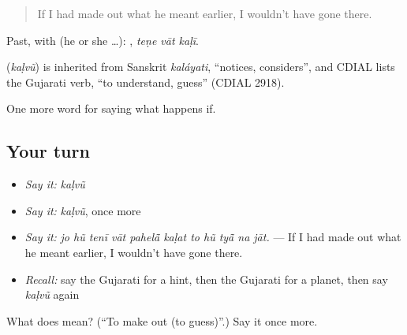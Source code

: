 \begin{quote}
If I had made out what he meant earlier, I wouldn't have gone there.
\end{quote}

Past, with  (he or she …):   , \emph{teṇe vāt kaḷī}.

\begin{cousinweb}
\textbf{} (\emph{kaḷvũ}) is inherited from Sanskrit \emph{kaláyati}, \textquotedblleft{}notices, considers\textquotedblright{}, and CDIAL lists the Gujarati verb, \textquotedblleft{}to understand, guess\textquotedblright{} (CDIAL 2918).
\end{cousinweb}

\begin{grammarlens}[title={What you've built}]
One more word for saying what happens if.
\end{grammarlens}

\subsection*{Your turn}
\begin{itemize}
\raggedright
  \item \emph{Say it:} \emph{kaḷvũ}
  \item \emph{Say it:} \emph{kaḷvũ}, once more
  \item \emph{Say it:} \emph{jo hũ tenī vāt pahelā̃ kaḷat to hũ tyā̃ na jāt.} — If I had made out what he meant earlier, I wouldn't have gone there.
  \item \emph{Recall:} say the Gujarati for a hint, then the Gujarati for a planet, then say \emph{kaḷvũ} again
\end{itemize}

\begin{tcolorbox}[breakable,colback=teal!4,colframe=teal!35!black,title={Before you move on}]
What does  mean? (\textquotedblleft{}To make out (to guess)\textquotedblright{}.) Say it once more.
\end{tcolorbox}
